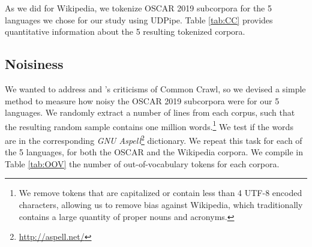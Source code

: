 As we did for Wikipedia, we tokenize OSCAR 2019 subcorpora for the 5 languages we chose for our study using UDPipe. Table \ref{tab:CC} provides quantitative information about the 5 resulting tokenized corpora.

\begin{table}[t]
    \centering\small
    \caption{Size of OSCAR 2019 subcorpora, measured in bytes, thousands of tokens, words and sentences.}
    \label{tab:CC}
\end{table}

\subsection{Noisiness}

We wanted to address \citep{trinh-le-2018-a} and \citep{radford-etal-2019-language}'s criticisms of Common Crawl, so we devised a simple method to measure how noisy the OSCAR 2019 subcorpora were for our 5 languages. We randomly extract a number of lines from each corpus, such that the resulting random sample contains one million words.\footnote{We remove tokens that are capitalized or contain less than 4 UTF-8 encoded characters, allowing us to remove bias against Wikipedia, which traditionally contains a large quantity of proper nouns and acronyms.} We test if the words are in the corresponding \emph{GNU Aspell}\footnote{\url{http://aspell.net/}} dictionary. We repeat this task for each of the 5 languages, for both the OSCAR and the Wikipedia corpora. We compile in Table \ref{tab:OOV} the number of out-of-vocabulary tokens for each corpora.

